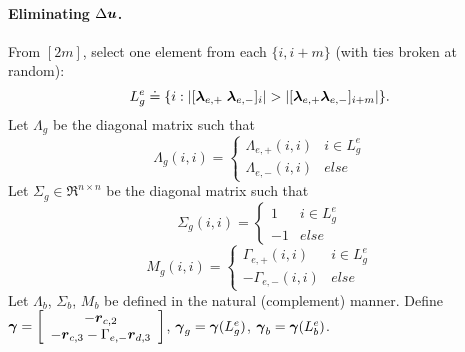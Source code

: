 \paragraph{Eliminating $\Delta \boldsymbol{u}$.}

From $[2m]$, select one element from each $\{ i, i+m\}$ (with ties broken at random):
$$L^e_g \doteq \{ i : | [\boldsymbol{\lambda}_{e,+} \; \boldsymbol{\lambda}_{e,-}]_i | > | [\boldsymbol{\lambda}_{e,+} \\ \boldsymbol{\lambda}_{e,-} ]_{i+m} | \}.$$
Let $\Lambda_g$ be the diagonal matrix such that
$$\Lambda_g(i,i) = \left\{ \begin{array}{cc} \Lambda_{e,+}(i,i) & i \in L^e_g \\ \Lambda_{e,-}(i,i) & else \end{array}\right .$$ 
Let $\Sigma_g \in \Re^{n \times n}$ be the diagonal matrix such that 
$$\Sigma_g(i,i) = \left\{ \begin{array}{cc} 1 & i \in L^e_g \\ -1 & else \end{array}\right.$$
$$M_g(i,i) = \left\{ \begin{array}{cc} \Gamma_{e,+}(i,i) & i \in L^e_g \\ -\Gamma_{e,-}(i,i) & else \end{array}\right.$$ 
Let $\Lambda_b$, $\Sigma_b$, $M_b$ be defined in the natural (complement) manner. Define $\boldsymbol{\gamma} =  \left[ \begin{array}{c} - \boldsymbol{r}_{c,2} \\ -\boldsymbol{r}_{c,3} - \Gamma_{e,-} \boldsymbol{r}_{d,3} \end{array} \right]$, $\boldsymbol{\gamma}_g = \boldsymbol{\gamma}(L^e_g)$, $\boldsymbol{\gamma}_b = \boldsymbol{\gamma}(L^e_b)$.

